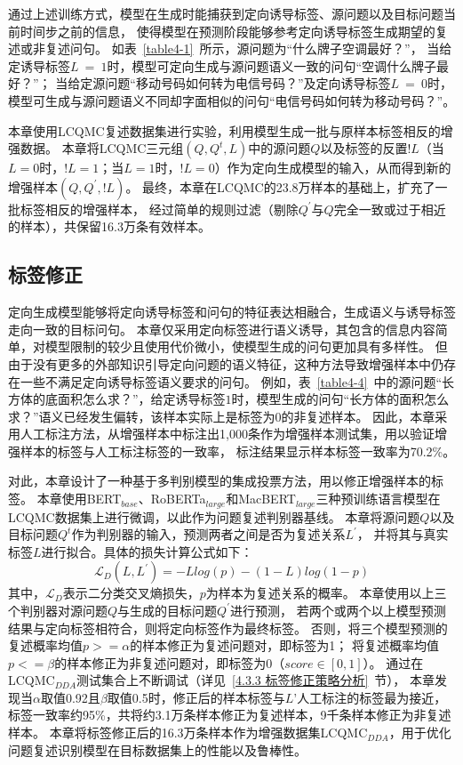 通过上述训练方式，模型在生成时能捕获到定向诱导标签、源问题以及目标问题当前时间步之前的信息，
使得模型在预测阶段能够参考定向诱导标签生成期望的复述或非复述问句。
如表~\ref{table4-1}~所示，源问题为{\kai“什么牌子空调最好？”}，
当给定诱导标签$L\ =\ 1$时，模型可定向生成与源问题语义一致的问句{\kai“空调什么牌子最好？”}；
当给定源问题{\kai“移动号码如何转为电信号码？”}及定向诱导标签$L\ =\ 0$时，
模型可生成与源问题语义不同却字面相似的问句{\kai“电信号码如何转为移动号码？”}。

本章使用LCQMC复述数据集进行实验，利用模型生成一批与原样本标签相反的增强数据。
本章将LCQMC三元组$(Q,Q^t,L)$中的源问题$Q$以及标签的反置$!L$（当$L=0$时，$!L=1$；当$L=1$时，$!L=0$）作为定向生成模型的输入，从而得到新的增强样本$(Q,Q^\prime,!L)$。
最终，本章在LCQMC的23.8万样本的基础上，扩充了一批标签相反的增强样本，
经过简单的规则过滤（剔除$Q^\prime$与$Q$完全一致或过于相近的样本），共保留16.3万条有效样本。

\subsection{标签修正}

定向生成模型能够将定向诱导标签和问句的特征表达相融合，生成语义与诱导标签走向一致的目标问句。
本章仅采用定向标签进行语义诱导，其包含的信息内容简单，对模型限制的较少且使用代价微小，使模型生成的问句更加具有多样性。
但由于没有更多的外部知识引导定向问题的语义特征，这种方法导致增强样本中仍存在一些不满足定向诱导标签语义要求的问句。
例如，表~\ref{table4-4}~中的源问题{\kai“长方体的底面积怎么求？”}，给定诱导标签$1$时，模型生成的问句{\kai“长方体的面积怎么求？”}语义已经发生偏转，该样本实际上是标签为$0$的非复述样本。
因此，本章采用人工标注方法，从增强样本中标注出1,000条作为增强样本测试集，用以验证增强样本的标签与人工标注标签的一致率，
标注结果显示样本标签一致率为70.2\%。

对此，本章设计了一种基于多判别模型的集成投票方法，用以修正增强样本的标签。
本章使用BERT$_{base}$\cite{devlin2018bert}、RoBERTa$_{large}$\cite{liu2019roberta}和MacBERT$_{large}$\cite{cui2020revisiting}三种预训练语言模型在LCQMC数据集上进行微调，以此作为问题复述判别器基线。
本章将源问题$Q$以及目标问题$Q^t$作为判别器的输入，预测两者之间是否为复述关系$L^\prime$，
并将其与真实标签$L$进行拟合。具体的损失计算公式如下：
\begin{equation}
    \mathcal{L}_D(L,L^\prime)=-Llog(p)-(1-L)log(1-p)
\end{equation}
其中，$\mathcal{L}_D$表示二分类交叉熵损失，$p$为样本为复述关系的概率。
本章使用以上三个判别器对源问题$Q$与生成的目标问题$Q^\prime$进行预测，
若两个或两个以上模型预测结果与定向标签相符合，则将定向标签作为最终标签。
否则，将三个模型预测的复述概率均值$p>=\alpha$的样本修正为复述问题对，即标签为1；
将复述概率均值$p<=\beta$的样本修正为非复述问题对，即标签为0（$score\in[0,1]$）。
通过在LCQMC$_{DDA}$测试集合上不断调试（详见~\ref{4.3.3 标签修正策略分析}~节），
本章发现当$\alpha$取值0.92且$\beta$取值0.5时，修正后的样本标签与$L’$人工标注的标签最为接近，
标签一致率约95\%，共将约3.1万条样本修正为复述样本，9千条样本修正为非复述样本。
本章将标签修正后的16.3万条样本作为增强数据集LCQMC$_{DDA}$，用于优化问题复述识别模型在目标数据集上的性能以及鲁棒性。


